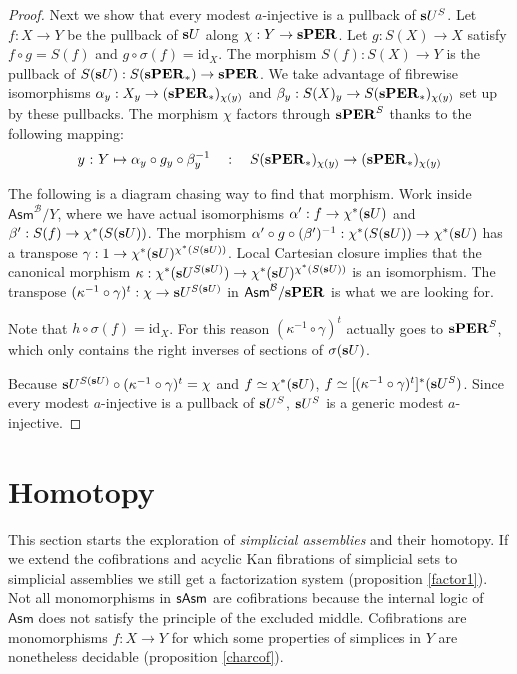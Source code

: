 \documentclass{amsart}
\theoremstyle{plain}
\theoremstyle{definition}
\newcommand\hide[1]{}
\newcommand\cat\mathcal
\newcommand\id{\mathrm{id}}
\newcommand\ri{^*}
\newcommand\Asm{\mathsf{Asm}}
\begin{document}
\begin{proof}
Next we show that every modest $a$-injective is a pullback of $\mathbf{s} U^S$.
Let $f:X\to Y$ be the pullback of $\mathbf{s} U$ along $\chi:Y\to \mathbf{s} \mathbf{PER}$. Let $g:S(X) \to X$ satisfy $f\circ g = S(f)$ and $g\circ \sigma(f) = \id_X$. The morphism $S(f):S(X)\to Y$ is the pullback of $S(\mathbf{s} U):S(\mathbf{s}\mathbf{PER}_*) \to \mathbf{s}\mathbf{PER}$. We take advantage of fibrewise isomorphisms $\alpha_y:X_y \to (\mathbf{s}\mathbf{PER}_*)_{\chi(y)}$ and $\beta_y:S(X)_y\to S(\mathbf{s}\mathbf{PER}_*)_{\chi(y)}$ set up by these pullbacks. The morphism $\chi$ factors through $\mathbf{s}\mathbf{PER}^S$ thanks to the following mapping: 
\[ y\mathord{\ :\ } Y  \mapsto \alpha_y\circ g_y\circ \beta_y^{-1}\quad:\quad S(\mathbf{s}\mathbf{PER}_*)_{\chi(y)}\to (\mathbf{s}\mathbf{PER}_*)_{\chi(y)} \]

\hide{generalized elements}
The following is a diagram chasing way to find that morphism.
Work inside $\Asm^{\cat B}/Y$, where we have actual isomorphisms $\alpha':f\to \chi\ri(\rat U)$ and $\beta':S(f)\to\chi\ri(S(\rat U))$. 
The morphism $\alpha'\circ g\circ (\beta')^{-1}:\chi\ri(S(\rat U)) \to \chi\ri(\rat U)$ has a transpose $\gamma:1\to \chi\ri(\rat U)^{\chi\ri(S(\rat U))}$. 
Local Cartesian closure implies that the canonical morphism $\kappa:\chi\ri(\rat U^{S(\rat U)})\to \chi\ri(\rat U)^{\chi\ri(S(\rat U))}$ is an isomorphism.
The transpose $(\kappa^{-1}\circ\gamma)^t:\chi\to \mathbf{s} U^{S(\mathbf{s} U)}$ in $\Asm^{\cat B}/\rat\pers$ is what we are looking for.

Note that $h\circ \sigma(f) = \id_X$. For this reason $(\kappa^{-1}\circ\gamma)^t$ actually goes to $\mathbf{s}\mathbf{PER}^S$, which only contains the right inverses of sections of $\sigma(\mathbf{s} U)$.

\hide{Kunnen we vast aantonen met de juiste pullbacks, maar misschien gaat dat te ver.}

Because $\mathbf{s} U^{S(\mathbf{s} U)}\circ (\kappa^{-1}\circ\gamma)^t = \chi$ and $f\simeq \chi\ri(\rat U)$, $f\simeq [(\kappa^{-1}\circ\gamma)^t]\ri(\rat U^S)$. Since every modest $a$-injective is a pullback of $\mathbf{s} U^S$, $\mathbf{s} U^S$ is a generic modest $a$-injective.
\end{proof}

\section{Homotopy}
This section starts the exploration of \emph{simplicial assemblies} and their homotopy. If we extend the cofibrations and acyclic Kan fibrations of simplicial sets to simplicial assemblies we still get a factorization system (proposition \ref{factor1}). Not all monomorphisms in $\mathsf{sAsm}$ are cofibrations because the internal logic of $\Asm$ does not satisfy the principle of the excluded middle. Cofibrations are monomorphisms $f:X\to Y$ for which some properties of simplices in $Y$ are nonetheless decidable (proposition \ref{charcof}).
\end{document}
